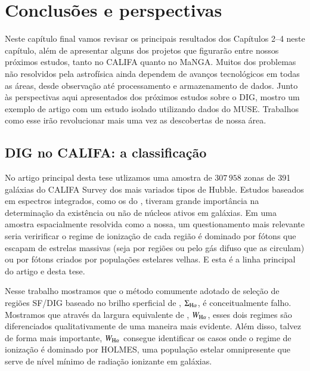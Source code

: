 
\chapter{Conclusões e perspectivas}
\label{sec:concl}

Neste capítulo final vamos revisar os principais resultados dos Capítulos 2--4 neste capítulo, além de apresentar alguns dos projetos que figurarão entre nossos próximos estudos, tanto no CALIFA quanto no MaNGA. Muitos dos problemas não resolvidos pela astrofísica ainda dependem de avanços tecnológicos em todas as áreas, desde observação até processamento e armazenamento de dados. Junto às perspectivas aqui apresentados dos próximos estudos sobre o DIG, mostro um exemplo de artigo com um estudo isolado utilizando dados do MUSE. Trabalhos como esse irão revolucionar mais uma vez as descobertas de nossa área.


\section{DIG no CALIFA: a classificação}
\label{sec:concl:DIGCALIFA}
No artigo principal desta tese utlizamos uma amostra de $307\,958$ zonas de 391 galáxias do CALIFA Survey dos mais variados tipos de Hubble. Estudos baseados em espectros integrados, como os do \SDSS, tiveram grande importância na determinação da existência ou não de núcleos ativos em galáxias. Em uma amostra espacialmente resolvida como a nossa, um questionamento mais relevante seria veririficar o regime de ionização de cada região é dominado por fótons que escapam de estrelas massivas (seja por regiões \hii ou pelo gás difuso que as circulam) ou por fótons criados por populações estelares velhas. E esta é a linha principal do artigo \citet[][Apêndice \ref{apendice:DIGpaper0}]{Lacerda.etal.2018} e desta tese.

Nesse trabalho mostramos que o método comumente adotado de seleção de regiões SF/DIG baseado no brilho sperficial de \Ha, $\Sigma_{\Ha}$, é conceitualmente falho. Mostramos que  através da largura equivalente de \Ha, $W_{\Ha}$, esses dois regimes são diferenciados qualitativamente de uma maneira mais evidente. Além disso, talvez de forma mais importante, $W_{\Ha}$ consegue identificar os casos onde o regime de ionização é dominado por HOLMES, uma população estelar omnipresente que serve de nível mínimo de radiação ionizante em galáxias.

